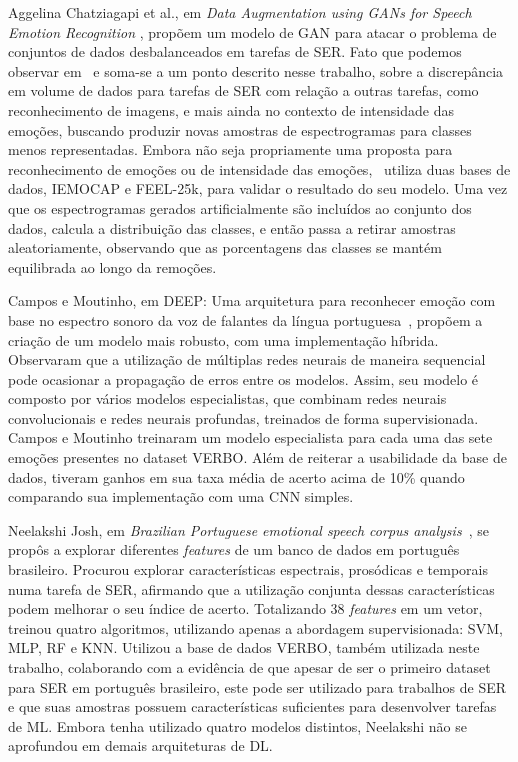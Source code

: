 Aggelina Chatziagapi et al., em \textit{Data Augmentation using GANs for Speech Emotion Recognition }\cite{32.89}, propõem um modelo de \acrshort{GAN} para atacar o problema de conjuntos de dados desbalanceados em tarefas de \acrshort{SER}. Fato que podemos observar em~\cite{32.32} e soma-se a um ponto descrito nesse trabalho, sobre a discrepância em volume de dados para tarefas de \acrshort{SER} com relação a outras tarefas, como reconhecimento de imagens, e mais ainda no contexto de intensidade das emoções, buscando produzir novas amostras de espectrogramas para classes menos representadas. Embora não seja propriamente uma proposta para reconhecimento de emoções ou de intensidade das emoções,~\cite{32.89} utiliza duas bases de dados, IEMOCAP e FEEL-25k, para validar o resultado do seu modelo. Uma vez que os espectrogramas gerados artificialmente são incluídos ao conjunto dos dados, calcula a distribuição das classes, e então passa a retirar amostras aleatoriamente, observando que as porcentagens das classes se mantém equilibrada ao longo da remoções.

Campos e Moutinho, em DEEP: Uma arquitetura para reconhecer emoção com base no espectro sonoro da voz de falantes da língua portuguesa~\cite{12}, propõem a criação de um modelo mais robusto, com uma implementação híbrida. Observaram que a utilização de múltiplas redes neurais de maneira sequencial pode ocasionar a propagação de erros entre os modelos. Assim, seu modelo é composto por vários modelos especialistas, que combinam redes neurais convolucionais e redes neurais profundas, treinados de forma supervisionada. Campos e Moutinho treinaram um modelo especialista para cada uma das sete emoções presentes no dataset VERBO. Além de reiterar a usabilidade da base de dados, tiveram ganhos em sua taxa média de acerto acima de 10\% quando comparando sua implementação com uma \acrshort{CNN} simples.

Neelakshi Josh, em \textit{Brazilian Portuguese emotional speech corpus analysis}~\cite{20}, se propôs a explorar diferentes \textit{features} de um banco de dados em português brasileiro. Procurou explorar características espectrais, prosódicas e temporais numa tarefa de \acrshort{SER}, afirmando que a utilização conjunta dessas características podem melhorar o seu índice de acerto. Totalizando 38 \textit{features} em um vetor, treinou quatro algoritmos, utilizando apenas a abordagem supervisionada: \acrshort{SVM}, \acrshort{MLP}, \acrshort{RF} e \acrshort{KNN}. Utilizou a base de dados VERBO, também utilizada neste trabalho, colaborando com a evidência de que apesar de ser o primeiro dataset para \acrshort{SER} em português brasileiro, este pode ser utilizado para trabalhos de \acrshort{SER} e que suas amostras possuem características suficientes para desenvolver tarefas de \acrshort{ML}. Embora tenha utilizado quatro modelos distintos, Neelakshi não se aprofundou em demais arquiteturas de \acrshort{DL}.

